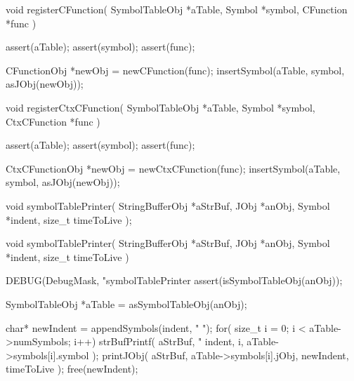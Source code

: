 void registerCFunction(
  SymbolTableObj *aTable,
  Symbol         *symbol,
  CFunction      *func
) {
  assert(aTable);
  assert(symbol);
  assert(func);
  
  CFunctionObj *newObj = newCFunction(func);
  insertSymbol(aTable, symbol, asJObj(newObj));
}

void registerCtxCFunction(
  SymbolTableObj *aTable,
  Symbol         *symbol,
  CtxCFunction   *func
) {
  assert(aTable);
  assert(symbol);
  assert(func);
  
  CtxCFunctionObj *newObj = newCtxCFunction(func);
  insertSymbol(aTable, symbol, asJObj(newObj));
}
\stopCCode

\startCHeader
void symbolTablePrinter(
  StringBufferObj *aStrBuf,
  JObj            *anObj,
  Symbol          *indent,
  size_t           timeToLive
);
\stopCHeader

\startCCode
void symbolTablePrinter(
  StringBufferObj *aStrBuf,
  JObj            *anObj,
  Symbol          *indent,
  size_t           timeToLive
) {
  DEBUG(DebugMask, "symbolTablePrinter %
  assert(isSymbolTableObj(anObj));
  
  SymbolTableObj *aTable = asSymbolTableObj(anObj);
  
  char* newIndent = appendSymbols(indent, "  ");
  for( size_t i = 0; i < aTable->numSymbols; i++) {
    strBufPrintf(
      aStrBuf,
      "%
      indent,
      i,
      aTable->symbols[i].symbol
    );
    printJObj(
      aStrBuf,
      aTable->symbols[i].jObj,
      newIndent,
      timeToLive
    );
  }
  free(newIndent);
}
\stopCCode